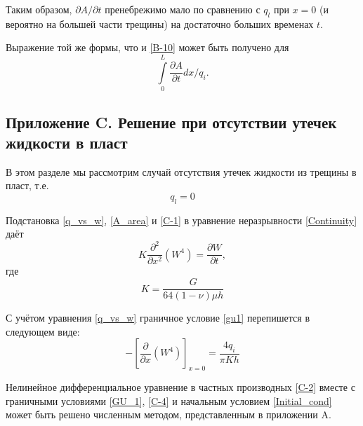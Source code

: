 \documentclass[a4paper, 12pt]{article}
\newcommand{\beq}{\begin{equation}}
\newcommand{\eeq}{\end{equation}}
\begin{document}
Таким образом, $\partial A/\partial t$ пренебрежимо мало по сравнению с $q_l$ при $x=0$ (и вероятно на большей части трещины) на достаточно больших временах $t$.

Выражение той же формы, что и \eqref{B-10} может быть получено для
$$
\int\limits_{0}^{L}{\frac{\partial A}{\partial t}dx/q_i}.
$$

\subsection{Приложение C. Решение при отсутствии утечек жидкости в пласт}

В этом разделе мы рассмотрим случай отсутствия утечек жидкости из трещины в пласт, т.е.
\beq\label{C-1}
q_l=0
\tag{C-1}
\eeq

Подстановка \eqref{q_vs_w}, \eqref{A_area} и \eqref{C-1} в уравнение неразрывности \eqref{Continuity} даёт
\beq\label{C-2}
K\frac{\partial^2}{\partial x^2}\left(W^4\right)=\frac{\partial W}{\partial t},
\tag{C-2}
\eeq
где
\beq\label{C-3}
K=\frac{G}{64(1-\nu)\mu h}
\tag{C-3}
\eeq

С учётом уравнения \eqref{q_vs_w} граничное условие \eqref{gu1} перепишется в следующем виде:
\beq\label{C-4}
-\left[\frac{\partial}{\partial x}\left(W^4\right)\right]_{x=0}=\frac{4q_i}{\pi Kh}
\tag{C-4}
\eeq

Нелинейное дифференциальное уравнение в частных производных \eqref{C-2} вместе с граничными условиями \eqref{GU_1}, \eqref{C-4} и начальным условием \eqref{Initial_cond} может быть решено численным методом, представленным в приложении A.
\end{document}
